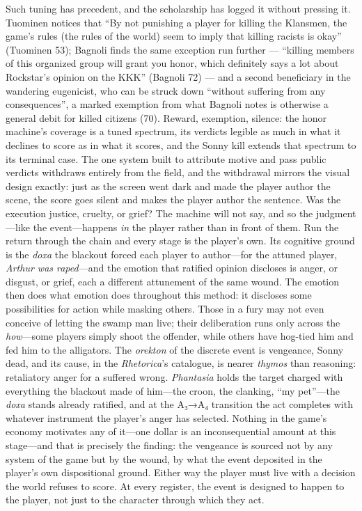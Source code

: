 Such tuning has precedent, and the scholarship has logged it without pressing it. Tuominen notices that ``By not punishing a player for killing the Klansmen, the game's rules (the rules of the world) seem to imply that killing racists is okay'' (Tuominen 53); Bagnoli finds the same exception run further — ``killing members of this organized group will grant you honor, which definitely says a lot about Rockstar's opinion on the KKK'' (Bagnoli 72) — and a second beneficiary in the wandering eugenicist, who can be struck down ``without suffering from any consequences'', a marked exemption from what Bagnoli notes is otherwise a general debit for killed citizens (70). Reward, exemption, silence: the honor machine's coverage is a tuned spectrum, its verdicts legible as much in what it declines to score as in what it scores, and the Sonny kill extends that spectrum to its terminal case. The one system built to attribute motive and pass public verdicts withdraws entirely from the field, and the withdrawal mirrors the visual design exactly: just as the screen went dark and made the player author the scene, the score goes silent and makes the player author the sentence. Was the execution justice, cruelty, or grief? The machine will not say, and so the judgment---like the event---happens \textit{in} the player rather than in front of them. Run the return through the chain and every stage is the player's own. Its cognitive ground is the \textit{doxa} the blackout forced each player to author---for the attuned player, \textit{Arthur was raped}---and the emotion that ratified opinion discloses is anger, or disgust, or grief, each a different attunement of the same wound. The emotion then does what emotion does throughout this method: it discloses some possibilities for action while masking others. Those in a fury may not even conceive of letting the swamp man live; their deliberation runs only across the \textit{how}---some players simply shoot the offender, while others have hog-tied him and fed him to the alligators. The \textit{orekton} of the discrete event is vengeance, Sonny dead, and its cause, in the \textit{Rhetorica}'s catalogue, is nearer \textit{thymos} than reasoning: retaliatory anger for a suffered wrong. \textit{Phantasia} holds the target charged with everything the blackout made of him---the croon, the clanking, ``my pet''---the \textit{doxa} stands already ratified, and at the A₃→A₄ transition the act completes with whatever instrument the player's anger has selected. Nothing in the game's economy motivates any of it---one dollar is an inconsequential amount at this stage---and that is precisely the finding: the vengeance is sourced not by any system of the game but by the wound, by what the event deposited in the player's own dispositional ground. Either way the player must live with a decision the world refuses to score. At every register, the event is designed to happen to the player, not just to the character through which they act.
